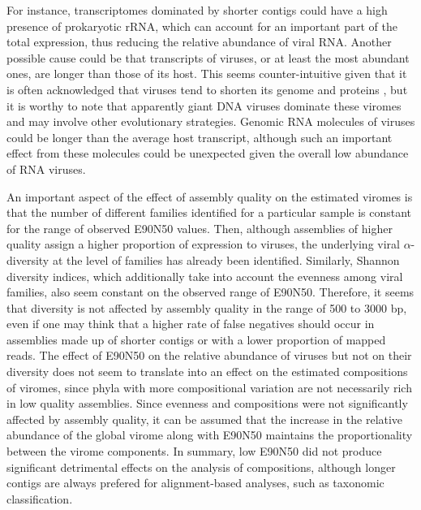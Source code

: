 \documentclass[
  openany]{book}
\begin{document}
For instance, transcriptomes dominated by shorter contigs could have a high presence of prokaryotic rRNA, which can account for an important part of the total expression, thus reducing the relative abundance of viral RNA. Another possible cause could be that transcripts of viruses, or at least the most abundant ones, are longer than those of its host. This seems counter-intuitive given that it is often acknowledged that viruses tend to shorten its genome and proteins \autocite{Belshaw2008,Rappoport2012}, but it is worthy to note that apparently giant DNA viruses dominate these viromes and may involve other evolutionary strategies. Genomic RNA molecules of viruses could be longer than the average host transcript, although such an important effect from these molecules could be unexpected given the overall low abundance of RNA viruses.

An important aspect of the effect of assembly quality on the estimated viromes is that the number of different families identified for a particular sample is constant for the range of observed E90N50 values. Then, although assemblies of higher quality assign a higher proportion of expression to viruses, the underlying viral \(\alpha\)-diversity at the level of families has already been identified. Similarly, Shannon diversity indices, which additionally take into account the evenness among viral families, also seem constant on the observed range of E90N50. Therefore, it seems that diversity is not affected by assembly quality in the range of 500 to 3000 bp, even if one may think that a higher rate of false negatives should occur in assemblies made up of shorter contigs or with a lower proportion of mapped reads. The effect of E90N50 on the relative abundance of viruses but not on their diversity does not seem to translate into an effect on the estimated compositions of viromes, since phyla with more compositional variation are not necessarily rich in low quality assemblies. Since evenness and compositions were not significantly affected by assembly quality, it can be assumed that the increase in the relative abundance of the global virome along with E90N50 maintains the proportionality between the virome components. In summary, low E90N50 did not produce significant detrimental effects on the analysis of compositions, although longer contigs are always prefered for alignment-based analyses, such as taxonomic classification.
\end{document}
